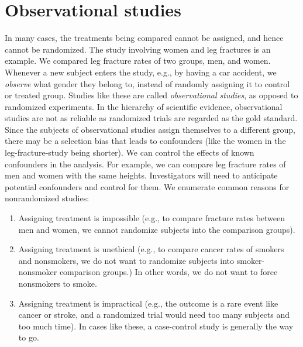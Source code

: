 \documentclass[11pt, chapterprefix=true]{scrbook}\usepackage[]{graphicx}\usepackage[]{color}
\begin{document}
\section{Observational studies}

In many cases, the treatments being compared cannot be assigned, and hence cannot be randomized.  The study involving women and leg fractures is an example.  We compared leg fracture rates of two groups, men, and women.  Whenever a new subject enters the study, e.g., by having a car accident, we \textit{observe} what gender they belong to, instead of randomly assigning it to control or treated group.  Studies like these are called \textit{observational studies}, as opposed to randomized experiments.  In the hierarchy of scientific evidence, observational studies are not as reliable as randomized trials are regarded as the gold standard. Since the subjects of observational studies assign themselves to a different group, there may be a selection bias that leads to confounders (like the women in the leg-fracture-study being shorter).  We can control the effects of known confounders in the analysis.  For example, we can compare leg fracture rates of men and women with the same heights.  Investigators will need to anticipate potential confounders and control for them. We enumerate common reasons for nonrandomized studies:

\begin{enumerate}
\item Assigning treatment is impossible (e.g., to compare fracture rates between men and women, we cannot randomize subjects into the comparison groups).

\item Assigning treatment is unethical (e.g., to compare cancer rates of smokers and nonsmokers, we do not want to randomize subjects into smoker-nonsmoker     comparison groups.)  In other words, we do not want to force nonsmokers to smoke.

\item Assigning treatment is impractical (e.g., the outcome is a rare event like cancer or stroke, and a randomized trial would need too many subjects and too much time).  In cases like these, a case-control study is generally the way to go.
\end{enumerate}

\end{document}
